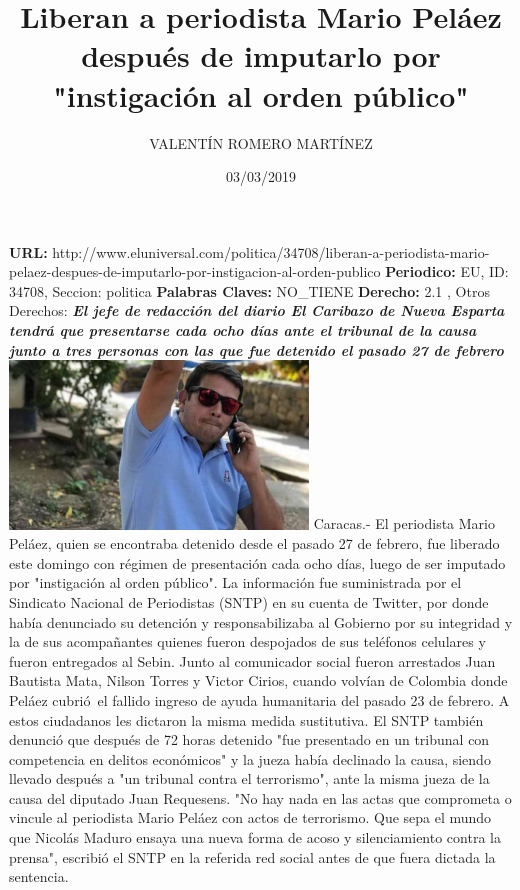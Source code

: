 \documentclass{article}%
\title{\textbf{Liberan a periodista Mario Peláez después de imputarlo por "instigación al orden público"}}%
\author{VALENTÍN ROMERO MARTÍNEZ}%
\date{03/03/2019}%
\begin{document}
%
\normalsize%
\maketitle%
\textbf{URL: }%
http://www.eluniversal.com/politica/34708/liberan{-}a{-}periodista{-}mario{-}pelaez{-}despues{-}de{-}imputarlo{-}por{-}instigacion{-}al{-}orden{-}publico\newline%
%
\textbf{Periodico: }%
EU, %
ID: %
34708, %
Seccion: %
politica\newline%
%
\textbf{Palabras Claves: }%
NO\_TIENE\newline%
%
\textbf{Derecho: }%
2.1%
, Otros Derechos: %
\newline%
%
\textbf{\textit{El jefe de redacción del diario El Caribazo de Nueva Esparta tendrá que presentarse cada ocho días ante el tribunal de la causa junto a tres personas con las que fue detenido el pasado 27 de febrero}}%
\newline%
\newline%
%
\includegraphics[width=300px]{EU_34708.jpg}%
\newline%
%
Caracas.{-} El periodista Mario Peláez, quien se encontraba detenido desde el pasado 27 de febrero, fue liberado este domingo con régimen de presentación cada ocho días, luego de ser imputado por "instigación al orden público".%
\newline%
%
La información fue suministrada por el Sindicato Nacional de Periodistas (SNTP) en su cuenta de Twitter, por donde había denunciado su detención y responsabilizaba al Gobierno por su integridad y la de sus acompañantes quienes fueron despojados de sus teléfonos celulares y fueron entregados al Sebin.%
\newline%
%
Junto al comunicador social fueron arrestados Juan Bautista Mata, Nilson Torres y Victor Cirios, cuando volvían de Colombia donde Peláez cubrió~el fallido ingreso de ayuda humanitaria del pasado 23 de febrero. A estos ciudadanos les dictaron la misma medida sustitutiva.%
\newline%
%
El SNTP también denunció que después de 72 horas detenido "fue presentado en un tribunal con competencia en delitos económicos" y la jueza había declinado la causa, siendo llevado después a "un tribunal contra el terrorismo", ante la misma jueza de la causa del diputado Juan Requesens.%
\newline%
%
"No hay nada en las actas que comprometa o vincule al periodista Mario Peláez con actos de terrorismo. Que sepa el mundo que Nicolás Maduro ensaya una nueva forma de acoso y silenciamiento contra la prensa", escribió el SNTP en la referida red social antes de que fuera dictada la sentencia.%
\newline%
%
\end{document}
